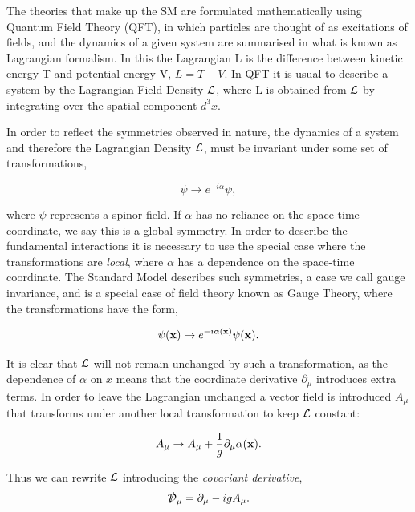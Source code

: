The theories that make up the SM are formulated mathematically using Quantum Field Theory (QFT), in which particles are thought of as excitations of fields, and the dynamics of a given system are summarised in what is known as Lagrangian formalism. In this the Lagrangian L is the difference between kinetic energy T and potential energy V, $L = T - V$. In QFT it is usual to describe a system by the Lagrangian Field Density ${\mathcal{L}}$, where L is obtained from ${\mathcal{L}}$ by integrating over the spatial component $d^{3}x$.


In order to reflect the symmetries observed in nature, the dynamics of a system and therefore the Lagrangian Density ${\mathcal{L}}$, must be invariant under some set of transformations,

\begin{equation}
\psi \rightarrow e^{-i\alpha}\psi, 
\label{GlobalTrans}
\end{equation}


where $\psi$ represents a spinor field. If $\alpha$ has no reliance on the space-time coordinate, we say this is a global symmetry. In order to describe the fundamental interactions it is necessary to use the special case where the transformations are \textit{local}, where $\alpha$ has a dependence on the space-time coordinate. The Standard Model describes such symmetries, a case we call gauge invariance, and is a special case of field theory known as Gauge Theory, where the transformations have the form, 


\begin{equation}
\psi(\mathbf{x}) \rightarrow e^{-i\alpha(\mathbf{x})}\psi (\mathbf{x}).
\label{LocalTrans}
\end{equation}


It is clear that ${\mathcal{L}}$ will not remain unchanged by such a transformation, as the dependence of $\alpha$ on $x$ means that the coordinate derivative $\partial_{\mu}$ introduces extra terms. In order to leave the Lagrangian unchanged a vector field is introduced $A_{\mu}$ that transforms under another local transformation to keep ${\mathcal{L}}$ constant: 

\begin{equation}
A_{\mu} \rightarrow A_{\mu} + \frac{1}{g} \partial_{\mu} \alpha(\mathbf{x}).
\label{ATrans}
\end{equation}

Thus we can rewrite ${\mathcal{L}}$ introducing the \textit{covariant derivative}, 
\begin{equation}
\slashed{\Dev}_{\mu} = \partial_{\mu} - igA_{\mu}. 
\end{equation}

